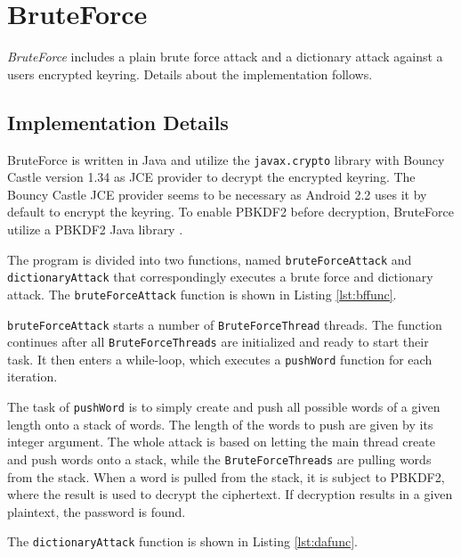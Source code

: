 \documentclass[pdftex,english,10pt,b5paper,twoside]{book}
\begin{document}
\section{BruteForce}

\emph{BruteForce} includes a plain brute force attack and a dictionary attack against
a users encrypted keyring. Details about the implementation follows.

\subsection{Implementation Details}

BruteForce is written in Java and utilize the \texttt{javax.crypto} library with Bouncy
Castle version 1.34 as JCE provider to decrypt the encrypted keyring. The
Bouncy Castle JCE provider seems to be necessary as Android 2.2 uses it by
default to encrypt the keyring. To enable PBKDF2 before decryption, BruteForce
utilize a PBKDF2 Java library \cite{pbkdf2}.

The program is divided into two functions, named \texttt{bruteForceAttack} and
\texttt{dictionaryAttack} that correspondingly executes a brute force and
dictionary attack. The \texttt{bruteForceAttack} function is shown in Listing
\ref{lst:bffunc}.



\texttt{bruteForceAttack} starts a number of \texttt{BruteForceThread} threads.
The function continues after all \texttt{BruteForceThreads} are initialized and
ready to start their task. It then enters a while-loop, which executes a
\texttt{pushWord} function for each iteration.

The task of \texttt{pushWord} is to simply create and push all possible words
of a given length onto a stack of words. The length of the words to push are
given by its integer argument. The whole attack is based on letting the main
thread create and push words onto a stack, while the \texttt{BruteForceThreads} are
pulling words from the stack. When a word is pulled from the stack, it is
subject to PBKDF2, where the result is used to decrypt the ciphertext. If
decryption results in a given plaintext, the password is found.

The \texttt{dictionaryAttack} function is shown in Listing \ref{lst:dafunc}.


\end{document}
